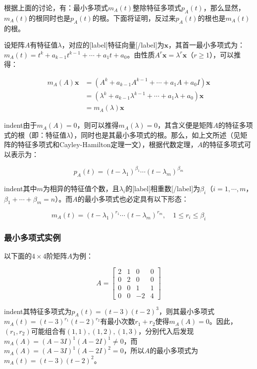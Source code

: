 \documentclass[UTF8,nofonts]{ctexart}
\begin{document}
根据上面的讨论，有：最小多项式$m_A(t)$整除特征多项式$p_A(t)$，那么显然，$m_A(t)$的根同时也是$p_A(t)$的根。下面将证明，反过来$p_A(t)$的根也是$m_A(t)$的根。

设矩阵$A$有特征值$\lambda$，对应的[label]特征向量[/label]为$\boldsymbol{x}$，其首一最小多项式为：$m_A(t)=t^k+a_{k-1}t^{k-1}+\cdots+a_1t+a_0$。由性质$A^r\boldsymbol{x}=\lambda^r\boldsymbol{x}$（$r \geq 1$），可以推得：

\begin{align*}
m_A(A)\boldsymbol{x}
&=(A^{k}+a_{k-1}A^{k-1}+\cdots+a_1A+a_0I)\boldsymbol{x} \\
&=(\lambda^k+a_{k-1}\lambda^{k-1}+\cdots+a_1\lambda+a_0)\boldsymbol{x} \\
&=m_A(\lambda)\boldsymbol{x}
\end{align*}

indent由于$m_A(A)=0$，则可以推得$m_A(\lambda)=0$，其含义便是矩阵$A$的特征多项式的根（即：特征值$\lambda$），同时也是其最小多项式的根。那么，如上文所述（见矩阵的特征多项式和Cayley-Hamilton定理一文），根据代数定理，$A$的特征多项式可以表示为：

\begin{equation}
\label{eq:chpoly}
p_A(t)=(t-\lambda_1)^{\beta_1}\cdots(t-\lambda_m)^{\beta_m}
\end{equation}

indent其中$m$为相异的特征值个数，且$\lambda_i$的[label]相重数[/label]为$\beta_i$（$i=1,\cdots,m$，$\beta_1+\cdots+\beta_m=n$）。而$A$的最小多项式也必定具有以下形态：

\begin{equation}
\label{eq:mmpoly}
m_A(t)=(t-\lambda_1)^{r_1}\cdots(t-\lambda_m)^{r_m},\quad
1 \leq r_i \leq \beta_i
\end{equation}

\subsubsection*{最小多项式实例}

以下面的$4 \times 4$阶矩阵$A$为例：

\[
A=\begin{bmatrix}2&1&0&0\\0&2&0&0\\0&0&1&1\\0&0&-2&4\end{bmatrix}
\]

indent其特征多项式为$p_A(t)=(t-3)(t-2)^3$，则其最小多项式$m_A(t)=(t-3)^{r_1}(t-2)^{r_2}$有最小次数$r_1+r_2$使得$m_A(A)=0$。因此，$(r_1,r_2)$可能组合有$(1,1),(1,2),(1,3)$，分别代入后发现$m_A(A)=(A-3I)^{1}(A-2I)^{1} \neq 0$，而$m_A(A)=(A-3I)^{1}(A-2I)^{2}=0$，所以$A$的最小多项式为$m_A(t)=(t-3)(t-2)^2$。
\end{document}
